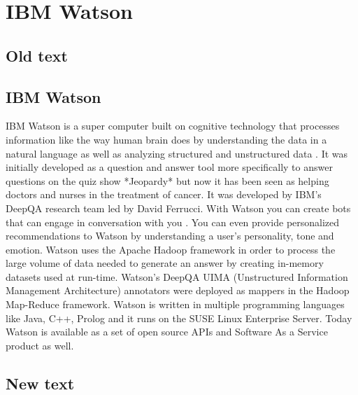 \section{IBM Watson}

\subsection{Old text}


\subsection{IBM Watson \cv}

IBM Watson is a super computer built on
cognitive technology that processes information like the way human
brain does by understanding the data in a natural language as well
as analyzing structured and unstructured data \cite{www-ibmwatson-wiki}.
It was initially
developed as a question and answer tool more specifically to
answer questions on the quiz show *Jeopardy* but now it has been
seen as helping doctors and nurses in the treatment of cancer. It
was developed by IBM's DeepQA research team led by David
Ferrucci. With Watson you can create bots that can engage
in conversation with you \cite{www-ibmwatson}. You can
even provide personalized recommendations to Watson by
understanding a user's personality, tone and emotion. Watson uses
the Apache Hadoop framework in order to process the large volume
of data needed to generate an answer by creating in-memory
datasets used at run-time. Watson's DeepQA UIMA (Unstructured
Information Management Architecture) annotators were deployed as
mappers in the Hadoop Map-Reduce framework. Watson is written in
multiple programming languages like Java, C++, Prolog and it runs
on the SUSE Linux Enterprise Server. Today Watson is available as
a set of open source
APIs and Software As a Service product as well\cite{www-ibmwatson}.

\pv

\subsection{New text}

